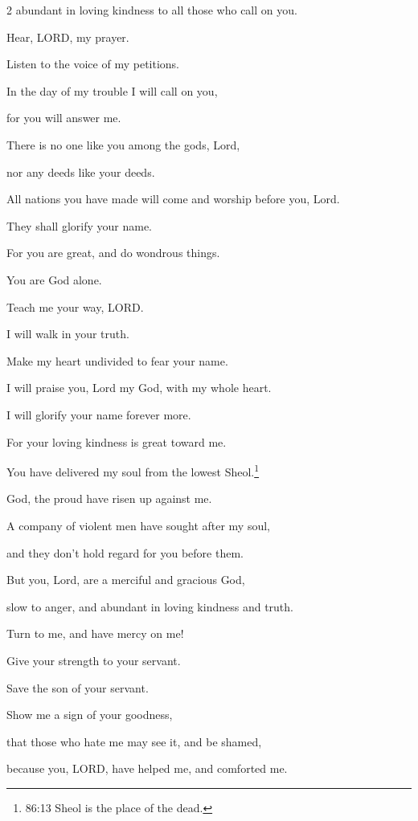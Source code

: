 \begin{multicols}{2}
	abundant in loving kindness to all those who call on you.
	
	
	\myverse{}Hear, LORD, my prayer.
	
	Listen to the voice of my petitions.
	
	
	\myverse{}In the day of my trouble I will call on you,
	
	for you will answer me.
	
	
	\myverse{}There is no one like you among the gods, Lord,
	
	nor any deeds like your deeds.
	
	
	\myverse{}All nations you have made will come and worship before you, Lord.
	
	They shall glorify your name.
	
	
	\myverse{}For you are great, and do wondrous things.
	
	You are God alone.
	
	
	\myverse{}Teach me your way, LORD.
	
	I will walk in your truth.
	
	Make my heart undivided to fear your name.
	
	
	\myverse{}I will praise you, Lord my God, with my whole heart.
	
	I will glorify your name forever more.
	
	
	\myverse{}For your loving kindness is great toward me.
	
	You have delivered my soul from the lowest Sheol.\footnote{86:13 Sheol is the place of the dead.}
	
	
	\myverse{}God, the proud have risen up against me.
	
	A company of violent men have sought after my soul,
	
	and they don’t hold regard for you before them.
	
	
	\myverse{}But you, Lord, are a merciful and gracious God,
	
	slow to anger, and abundant in loving kindness and truth.
	
	
	\myverse{}Turn to me, and have mercy on me!
	
	Give your strength to your servant.
	
	Save the son of your servant.
	
	
	\myverse{}Show me a sign of your goodness,
	
	that those who hate me may see it, and be shamed,
	
	because you, LORD, have helped me, and comforted me.
	

\end{multicols}
